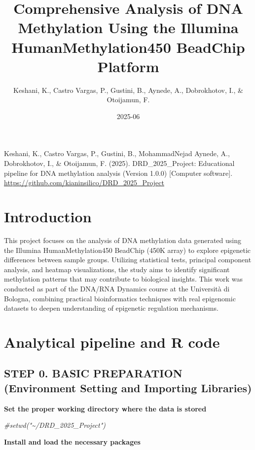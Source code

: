 \documentclass[
  11pt,
]{article}
\title{Comprehensive Analysis of DNA Methylation Using the Illumina
HumanMethylation450 BeadChip Platform}
\author{Keshani, K., Castro Vargas, P., Gustini, B., Aynede, A.,
Dobrokhotov, I., \& Otoijamun, F.}
\date{2025-06}
\newenvironment{Shaded}{\begin{snugshade}}{\end{snugshade}}
\newcommand{\CommentTok}[1]{\textcolor[rgb]{0.56,0.35,0.01}{\textit{#1}}}
\begin{document}
\maketitle

{
\setcounter{tocdepth}{3}
\tableofcontents
}
Keshani, K., Castro Vargas, P., Gustini, B., MohammadNejad Aynede, A.,
Dobrokhotov, I., \& Otoijamun, F. (2025). DRD\_2025\_Project:
Educational pipeline for DNA methylation analysis (Version 1.0.0)
{[}Computer software{]}.
\url{https://github.com/kianinsilico/DRD_2025_Project}

\section{Introduction}\label{introduction}

This project focuses on the analysis of DNA methylation data generated
using the Illumina HumanMethylation450 BeadChip (450K array) to explore
epigenetic differences between sample groups. Utilizing statistical
tests, principal component analysis, and heatmap visualizations, the
study aims to identify significant methylation patterns that may
contribute to biological insights. This work was conducted as part of
the DNA/RNA Dynamics course at the Università di Bologna, combining
practical bioinformatics techniques with real epigenomic datasets to
deepen understanding of epigenetic regulation mechanisms.

\section{Analytical pipeline and R
code}\label{analytical-pipeline-and-r-code}

\subsection{STEP 0. BASIC PREPARATION (Environment Setting and Importing
Libraries)}\label{step-0.-basic-preparation-environment-setting-and-importing-libraries}

\textbf{Set the proper working directory where the data is stored}

\begin{Shaded}
\begin{Highlighting}[]
\CommentTok{\#setwd("\textasciitilde{}/DRD\_2025\_Project")}
\end{Highlighting}
\end{Shaded}

\textbf{Install and load the necessary packages}
\end{document}

